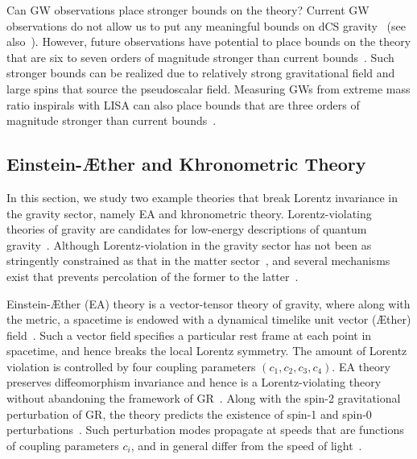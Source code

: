 \documentclass[prd,twocolumn,nofootinbib]{revtex4-1}
\begin{document}
Can GW observations place stronger bounds on the theory? Current GW observations do not allow us to put any meaningful bounds on dCS gravity~\cite{Yunes:2016jcc} (see also~\cite{Yagi:2017zhb}). However, future observations have potential to place bounds on the theory that are six to seven orders of magnitude stronger than current bounds~\cite{Yagi:2012vf}. Such stronger bounds can be realized due to relatively strong gravitational field and large spins that source the pseudoscalar field. Measuring GWs from extreme mass ratio inspirals with LISA can also place bounds that are three orders of magnitude stronger than current bounds~\cite{Canizares:2012is}. 


 \subsection{Einstein-\AE ther  and Khronometric Theory}

In this section, we study two example theories that break Lorentz invariance in the gravity sector, namely EA and khronometric theory. Lorentz-violating theories of gravity are candidates for low-energy descriptions of quantum gravity~\cite{Blas:2014aca,Horava:2009uw}. Although Lorentz-violation in the gravity sector has not been as stringently constrained as that in the matter sector~\cite{Mattingly:2005re,Jacobson:2005bg,Liberati:2013xla}, and several mechanisms exist that prevents percolation of the former to the latter~\cite{Liberati:2013xla,Pospelov:2010mp}.
 
 Einstein-\AE ther (EA) theory is a vector-tensor theory of gravity, where along with the metric, a spacetime is endowed with a dynamical timelike unit vector (\AE ther) field~\cite{Jacobson:2000xp,Jacobson:2008aj}. Such a vector field specifies a particular rest frame at each point in spacetime, and hence breaks the local Lorentz symmetry. The amount of Lorentz violation is controlled by four coupling parameters 
$(c_1,c_2,c_3,c_4)$. EA theory preserves diffeomorphism invariance and hence is a Lorentz-violating theory without abandoning the framework of GR~\cite{Jacobson:2008aj}. 
%
Along with the spin-2 gravitational perturbation of GR, the theory predicts the existence of spin-1 and spin-0 perturbations~\cite{Foster:2006az,Jacobson:2004ts,PhysRevD.76.084033}. Such perturbation modes propagate at speeds that are functions of coupling parameters $c_i$, and in general differ from the speed of light~\cite{Jacobson:2004ts}. 
 
\end{document}
